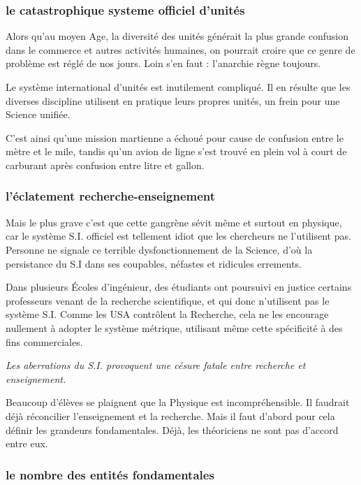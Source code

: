 \documentclass[a4paper,12pt]{article}
\begin{document}
\subsubsection {le catastrophique systeme officiel d'unités}

 Alors qu'au moyen Age, la diversité des unités générait la plus grande confusion dans le commerce et autres activités humaines, on pourrait croire que ce genre de problème est réglé de nos jours. Loin s'en faut   : l'anarchie règne toujours.
 

Le système international d'unités est inutilement compliqué. Il en résulte que les diverses discipline utilisent en pratique leurs propres unités, un frein pour  une Science unifiée. 


C'est ainsi qu'une mission martienne a échoué pour cause de confusion entre le mètre et le mile, tandis qu'un avion de ligne s'est trouvé en plein vol à court de carburant après confusion entre litre et gallon.

\subsubsection{l'éclatement recherche-enseignement}

Mais le plus grave c'est que cette gangrène sévit même et surtout en physique, car le système S.I. officiel est tellement idiot que les chercheurs ne l'utilisent pas. Personne ne signale ce terrible dysfonctionnement de la Science, d'où la persistance du S.I dans ses coupables, néfastes et ridicules errements.


Dans plusieurs Écoles d'ingénieur, des étudiants ont poursuivi en justice certains professeurs venant de la recherche scientifique, et qui donc n'utilisent pas le système S.I. Comme les USA contrôlent la Recherche, cela ne les encourage nullement à adopter le système métrique, utilisant même cette spécificité à des fins commerciales.


\textit{Les aberrations du S.I. provoquent une césure fatale entre recherche et enseignement.}

Beaucoup d'élèves se plaignent que la Physique est incompréhensible. Il faudrait déjà réconcilier l'enseignement et la recherche. Mais il faut d'abord pour cela définir les grandeurs fondamentales. Déjà, les théoriciens ne sont pas d'accord entre eux. 

\subsubsection{le nombre des entités fondamentales}
\end{document}
